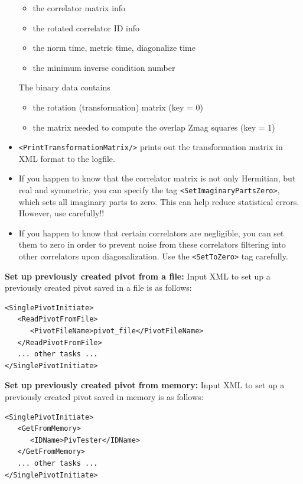 \documentclass[12pt]{article}
\newcommand{\vb}{\texttt}
\begin{document}
\begin{itemize}
\begin{itemize}
   \item the correlator matrix info                                               
   \item the rotated correlator ID info                                           
   \item the norm time, metric time, diagonalize time                             
   \item the minimum inverse condition number 
   \end{itemize}
The binary data contains
\begin{itemize}                                                      
   \item the rotation (transformation) matrix (key = 0)                           
   \item the matrix needed to compute the overlap Zmag squares (key = 1)          
\end{itemize}
\item 
\vb{<PrintTransformationMatrix/>} prints out the transformation 
matrix in XML format to the logfile.
\item                                                          
If you happen to know that the correlator matrix is not only Hermitian, but   
real and symmetric, you can specify the tag \vb{<SetImaginaryPartsZero>}, which    
sets all imaginary parts to zero.  This can help reduce statistical errors.   
However, use carefully!! 
\item
If you happen to know that certain correlators are negligible, you can set
them to zero in order to prevent noise from these correlators filtering into
other correlators upon diagonalization.  Use the \vb{<SetToZero>} tag
carefully.                               
\end{itemize}
\vspace*{5mm}\noindent
\textbf{Set up previously created pivot from a file:}\newline
Input XML to set up a previously created pivot saved in a file is as follows:
\begin{verbatim}
<SinglePivotInitiate>
   <ReadPivotFromFile>
      <PivotFileName>pivot_file</PivotFileName>
   </ReadPivotFromFile>
   ... other tasks ...
</SinglePivotInitiate>
\end{verbatim}
\vspace*{5mm}\noindent
\textbf{Set up previously created pivot from memory:}\newline
Input XML to set up a previously created pivot saved in memory is as follows:
\begin{verbatim}
<SinglePivotInitiate>
   <GetFromMemory>
      <IDName>PivTester</IDName>
   </GetFromMemory>
   ... other tasks ...
</SinglePivotInitiate>
\end{verbatim}
\end{document}
